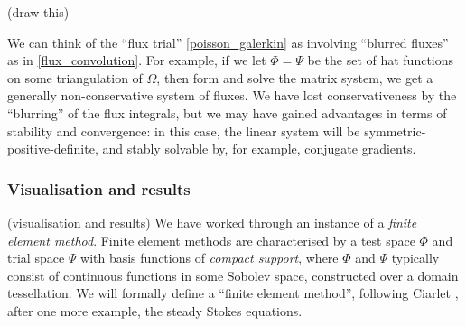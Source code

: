 \documentclass[11pt,a4paper]{memoir}
\begin{document}
\vskip 0.2in
(draw this)
\vskip 0.2in

We can think of the ``flux trial'' \eqref{poisson_galerkin} as involving ``blurred fluxes'' as in \eqref{flux_convolution}.
For example, if we let $\Phi = \Psi$ be the set of hat functions on some triangulation
of $\Omega$, then form and solve the matrix system, we get a generally non-conservative system of fluxes. We have lost conservativeness
by the ``blurring'' of the flux integrals, but we may have gained advantages in terms of stability and convergence: in this case,
the linear system will be symmetric-positive-definite, and stably solvable by, for example, conjugate gradients.

\subsubsection{Visualisation and results}
\vskip 0.2in
(visualisation and results)
\vskip 0.2in
We have worked through an instance of a \textit{finite element method}.
Finite element methods are characterised by a test space $\Phi$ and trial space
$\Psi$ with basis functions of \textit{compact support}, where $\Phi$ and $\Psi$ typically consist of continuous functions in
some Sobolev space, constructed over a domain tessellation. We will formally define a ``finite element method'', following Ciarlet \cite{ciarlet},
after one more example, the steady Stokes equations.
\end{document}
